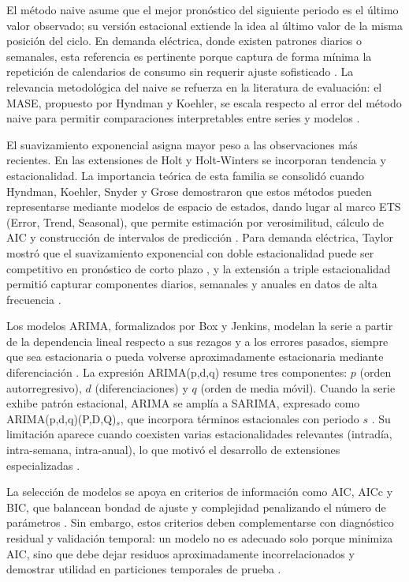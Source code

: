 El método naive asume que el mejor pronóstico del siguiente periodo es el último valor observado; su versión estacional extiende la idea al último valor de la misma posición del ciclo. En demanda eléctrica, donde existen patrones diarios o semanales, esta referencia es pertinente porque captura de forma mínima la repetición de calendarios de consumo sin requerir ajuste sofisticado \parencite{hyndman2021,taylor2003}. La relevancia metodológica del naive se refuerza en la literatura de evaluación: el MASE, propuesto por Hyndman y Koehler, se escala respecto al error del método naive para permitir comparaciones interpretables entre series y modelos \parencite{hyndman2006}.

El suavizamiento exponencial asigna mayor peso a las observaciones más recientes. En las extensiones de Holt y Holt-Winters se incorporan tendencia y estacionalidad. La importancia teórica de esta familia se consolidó cuando Hyndman, Koehler, Snyder y Grose demostraron que estos métodos pueden representarse mediante modelos de espacio de estados, dando lugar al marco ETS (Error, Trend, Seasonal), que permite estimación por verosimilitud, cálculo de AIC y construcción de intervalos de predicción \parencite{hyndman2002}. Para demanda eléctrica, Taylor mostró que el suavizamiento exponencial con doble estacionalidad puede ser competitivo en pronóstico de corto plazo \parencite{taylor2003}, y la extensión a triple estacionalidad permitió capturar componentes diarios, semanales y anuales en datos de alta frecuencia \parencite{taylor2010}.

Los modelos ARIMA, formalizados por Box y Jenkins, modelan la serie a partir de la dependencia lineal respecto a sus rezagos y a los errores pasados, siempre que sea estacionaria o pueda volverse aproximadamente estacionaria mediante diferenciación \parencite{box2015}. La expresión ARIMA(p,d,q) resume tres componentes: \(p\) (orden autorregresivo), \(d\) (diferenciaciones) y \(q\) (orden de media móvil). Cuando la serie exhibe patrón estacional, ARIMA se amplía a SARIMA, expresado como ARIMA(p,d,q)(P,D,Q)\(_s\), que incorpora términos estacionales con periodo \(s\) \parencite{hyndman2021,box2015}. Su limitación aparece cuando coexisten varias estacionalidades relevantes (intradía, intra-semana, intra-anual), lo que motivó el desarrollo de extensiones especializadas \parencite{taylor2003,taylor2010}.

La selección de modelos se apoya en criterios de información como AIC, AICc y BIC, que balancean bondad de ajuste y complejidad penalizando el número de parámetros \parencite{hyndman2021,hyndman2002}. Sin embargo, estos criterios deben complementarse con diagnóstico residual y validación temporal: un modelo no es adecuado solo porque minimiza AIC, sino que debe dejar residuos aproximadamente incorrelacionados y demostrar utilidad en particiones temporales de prueba \parencite{tashman2000,hyndman2021}.


